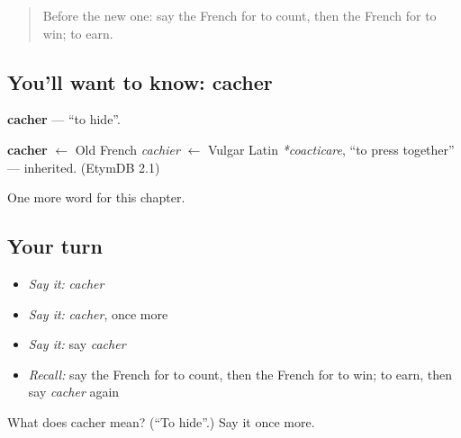\begin{quote}
Before the new one: say the French for to count, then the French for to win; to earn.
\end{quote}

\subsection*{You'll want to know: cacher}
\textbf{cacher} — \textquotedblleft{}to hide\textquotedblright{}.

\begin{cousinweb}
\textbf{cacher} $\leftarrow$ Old French \emph{cachier} $\leftarrow$ Vulgar Latin \emph{*coacticare}, \textquotedblleft{}to press together\textquotedblright{} — inherited. (EtymDB 2.1)
\end{cousinweb}

\begin{grammarlens}[title={What you've built}]
One more word for this chapter.
\end{grammarlens}

\subsection*{Your turn}
\begin{itemize}
\raggedright
  \item \emph{Say it:} \emph{cacher}
  \item \emph{Say it:} \emph{cacher}, once more
  \item \emph{Say it:} say \emph{cacher}
  \item \emph{Recall:} say the French for to count, then the French for to win; to earn, then say \emph{cacher} again
\end{itemize}

\begin{tcolorbox}[breakable,colback=teal!4,colframe=teal!35!black,title={Before you move on}]
What does cacher mean? (\textquotedblleft{}To hide\textquotedblright{}.) Say it once more.
\end{tcolorbox}
